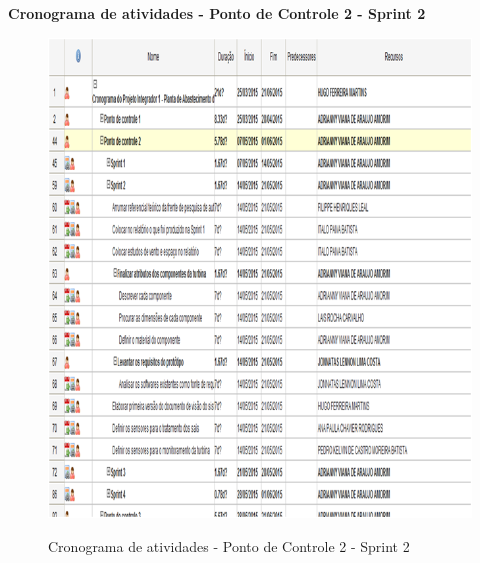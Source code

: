    \pagebreak
   \textbf{Cronograma de atividades - Ponto de Controle 2 - Sprint 2}
   \begin{figure}[!h]
    \centering
    \includegraphics[scale = 0.8]{editaveis/figuras/cronogramaPC2S2}
    \label{Cronograma de atividades PC2S2}
    \caption{Cronograma de atividades - Ponto de Controle 2 - Sprint 2}
   \end{figure}
   \FloatBarrier
   
